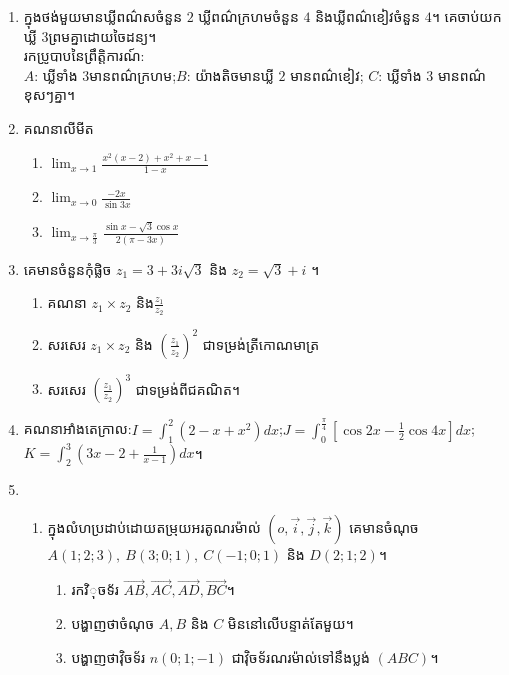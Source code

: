 \documentclass{officialexam}
\begin{document}
\begin{center}
\end{center}
\begin{enumerate}[I]
	\item ក្នុងថង់មួយមានឃ្លីពណ៌សចំនួន $2$ ឃ្លីពណ៌ក្រហមចំនួន $4$ និងឃ្លីពណ៌ខៀវចំនួន $4$។ គេចាប់យកឃ្លី $3$ព្រមគ្នាដោយចៃដន្យ។\\
	រកប្រូបាបនៃព្រឹត្តិការណ៍:\\ $A$: ឃ្លីទាំង $3$មានពណ៌ក្រហម;\quad $B$: យ៉ាងតិចមានឃ្លី $2$ មានពណ៌ខៀវ; \quad $C$: ឃ្លីទាំង $3$ មានពណ៌ខុសៗគ្នា។
	\item គណនាលីមីត
		\begin{enumerate}[k,3]
			\item $\lim_{x\to1}\frac{x^2\left(x-2\right)+x^2+x-1}{1-x}$
			\item $\lim_{x\to0}\frac{-2x}{\sin3x}$
			\item $\lim_{x\to\frac{\pi}{3}}\frac{\sin x-\sqrt{3}\cos x}{2\left(\pi-3x\right)}$ 
		\end{enumerate}
	\item គេមានចំនួនកុំផ្លិច $z_1=3+3i\sqrt{3}$ និង $z_2=\sqrt{3}+i$ ។
	\begin{enumerate}[k,2]
		\item គណនា $z_1\times z_2$ និង$\frac{z_1}{z_2}$
		\item សរសេរ $z_1\times z_2$ និង $\left(\frac{z_1}{z_2}\right)^{2}$ ជាទម្រង់ត្រីកោណមាត្រ
		\item សរសេរ $\left(\frac{z_1}{z_2}\right)^{3}$ ជាទម្រង់ពីជគណិត។
	\end{enumerate}
	\item គណនាអាំងតេក្រាល:\quad $I=\int_{1}^{2}\left(2-x+x^2\right)dx$;\quad $J=\int_{0}^{\frac{\pi}{4}}\left[\cos2x-\frac{1}{2}\cos4x\right]dx$;\quad $K=\int_{2}^{3}\left(3x-2+\frac{1}{x-1}\right)dx$។
	\item \begin{enumerate}[1]
		\item ក្នុងលំហប្រដាប់ដោយតម្រុយអរតូណរម៉ាល់ $\left(o,\vec{i},\vec{j},\vec{k}\right)$ គេមានចំណុច $A\left(1;2;3\right),~B\left(3;0;1\right),~C\left(-1;0;1\right)$ និង $D\left(2;1;2\right)$។
		\begin{enumerate}[a]
			\item រកវិុចទ័រ $\overrightarrow{AB},\overrightarrow{AC},\overrightarrow{AD},\overrightarrow{BC}$។
			\item បង្ហាញថាចំណុច $A,B$ និង $C$ មិននៅលើបន្ទាត់តែមួយ។
			\item បង្ហាញថាវុិចទ័រ $n\left(0;1;-1\right)$ ជាវុិចទ័រណរម៉ាល់ទៅនឹងប្លង់ $\left(ABC\right)$។

\end{enumerate}
\end{enumerate}
\end{enumerate}
\end{document}
